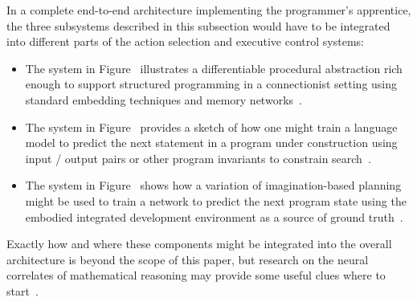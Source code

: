 In a complete end-to-end architecture implementing the programmer's apprentice, the three subsystems described in this subsection would have to be integrated into different parts of the action selection and executive control systems: 
%
\begin{itemize}
%
\item The system in Figure~{} illustrates a differentiable procedural abstraction rich enough to support structured programming in a connectionist setting using standard embedding techniques and memory networks~\cite{WestonetalCoRR-14,DanihelkaetalCoRR-16,GravesetalCoRR-14,GravesetalNATURE-16}.
%
\item The system in Figure~{} provides a sketch of how one might train a language model to predict the next statement in a program under construction using input / output pairs or other program invariants to constrain search~\cite{WangetalCoRR-18,WangetalCoRR-17,SinghandKohliSNAPL-17,DevlinetalICML-17}.
%
\item The system in Figure~{} shows how a variation of imagination-based planning might be used to train a network to predict the next program state using the embodied integrated development environment as a source of ground truth~\cite{WeberetalCoRR-17,PascanuetalCoRR-17,HamricketalCoRR-17}.
%
\end{itemize}

Exactly how and where these components might be integrated into the overall architecture is beyond the scope of this paper, but research on the neural correlates of mathematical reasoning may provide some useful clues where to start~\cite{DehaeneetalCOGNITIVE-NEUROPSYCHOLOGY-03,DehaeneandBrannon2011mathminds,AmalricandDehaenePNAS-16}.

